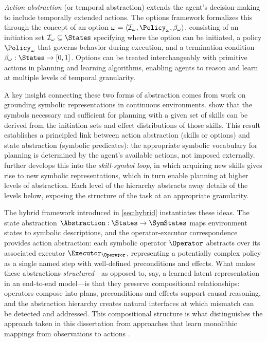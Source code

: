 \emph{Action abstraction} (or temporal abstraction) extends the agent's decision-making to include temporally extended actions. The options framework \citep{sutton1999options} formalizes this through the concept of an option $\omega = \langle \mathcal{I}_\omega, \Policy_\omega, \beta_\omega \rangle$, consisting of an initiation set $\mathcal{I}_\omega \subseteq \States$ specifying where the option can be initiated, a policy $\Policy_\omega$ that governs behavior during execution, and a termination condition $\beta_\omega : \States \rightarrow [0,1]$. Options can be treated interchangeably with primitive actions in planning and learning algorithms, enabling agents to reason and learn at multiple levels of temporal granularity.

A key insight connecting these two forms of abstraction comes from work on grounding symbolic representations in continuous environments. \citet{konidaris2018skills} show that the symbols necessary and sufficient for planning with a given set of skills can be derived from the initiation sets and effect distributions of those skills. This result establishes a principled link between action abstraction (skills or options) and state abstraction (symbolic predicates): the appropriate symbolic vocabulary for planning is determined by the agent's available actions, not imposed externally. \citet{konidaris2016constructing} further develops this into the \emph{skill-symbol loop}, in which acquiring new skills gives rise to new symbolic representations, which in turn enable planning at higher levels of abstraction. Each level of the hierarchy abstracts away details of the levels below, exposing the structure of the task at an appropriate granularity.

The hybrid framework introduced in \cref{sec:hybrid} instantiates these ideas. The state abstraction $\Abstraction : \States \rightarrow \SymStates$ maps environment states to symbolic descriptions, and the operator-executor correspondence provides action abstraction: each symbolic operator $\Operator$ abstracts over its associated executor $\Executor_\Operator$, representing a potentially complex policy as a single named step with well-defined preconditions and effects. What makes these abstractions \emph{structured}---as opposed to, say, a learned latent representation in an end-to-end model---is that they preserve compositional relationships: operators compose into plans, preconditions and effects support causal reasoning, and the abstraction hierarchy creates natural interfaces at which mismatch can be detected and addressed. This compositional structure is what distinguishes the approach taken in this dissertation from approaches that learn monolithic mappings from observations to actions \citep{konidaris2019necessity}.

